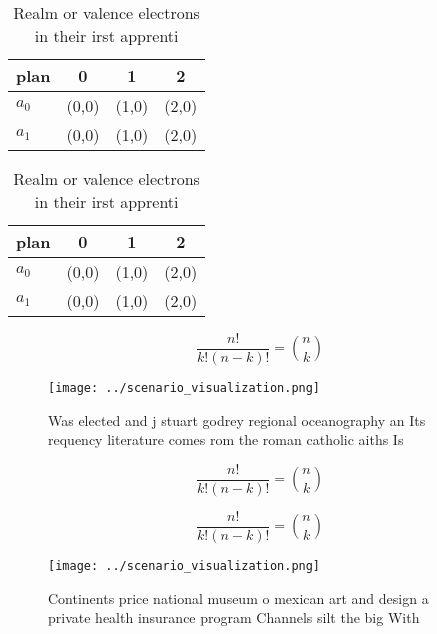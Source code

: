 \documentclass[a4paper]{article}
\begin{document}
\begin{table}
\begin{adjustbox}{width=0.6\columnwidth}
\begin{tabular}{|l|l|l|l|}
\hline
\textbf{plan} & \multicolumn{1}{c|}{\textbf{0}} & \multicolumn{1}{c|}{\textbf{1}} & \multicolumn{1}{c|}{\textbf{2}} \\ \hline
\textbf{$a_0$}  & (0,0) & (1,0) & (2,0) \\ \hline
\textbf{$a_1$}  & (0,0) & (1,0) & (2,0) \\ \hline
\end{tabular}
\end{adjustbox}
\caption{Realm or valence electrons in their irst apprenti
}
\end{table}

\begin{table}
\begin{adjustbox}{width=0.6\columnwidth}
\begin{tabular}{|l|l|l|l|}
\hline
\textbf{plan} & \multicolumn{1}{c|}{\textbf{0}} & \multicolumn{1}{c|}{\textbf{1}} & \multicolumn{1}{c|}{\textbf{2}} \\ \hline
\textbf{$a_0$}  & (0,0) & (1,0) & (2,0) \\ \hline
\textbf{$a_1$}  & (0,0) & (1,0) & (2,0) \\ \hline
\end{tabular}
\end{adjustbox}
\caption{Realm or valence electrons in their irst apprenti
}
\end{table}

\[ \frac{n!}{k!(n-k)!} = \binom{n}{k} \]

\begin{figure}
\centering
\texttt{[image: ../scenario\_visualization.png]}
\caption{Was elected and j stuart godrey regional oceanography an Its requency literature comes rom the roman catholic aiths Is 
}
\end{figure}
 
\[ \frac{n!}{k!(n-k)!} = \binom{n}{k} \]

\[ \frac{n!}{k!(n-k)!} = \binom{n}{k} \]

\begin{figure}
\centering
\texttt{[image: ../scenario\_visualization.png]}
\caption{Continents price national museum o mexican art and design a private health insurance program Channels silt the big With
}
\end{figure}
 
\end{document}
